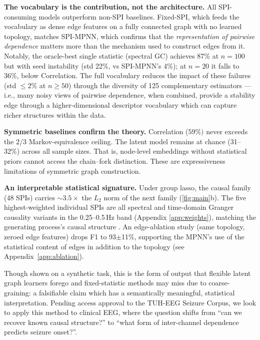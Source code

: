 \documentclass{article}
\begin{document}
\textbf{The vocabulary is the contribution, not the architecture.} All SPI-consuming models outperform non-SPI baselines. Fixed-SPI, which feeds the vocabulary as dense edge features on a fully connected graph with no learned topology, matches SPI-MPNN, which confirms that the \textit{\emph{representation of pairwise dependence}} matters more than the mechanism used to construct edges from it. Notably, the oracle-best single statistic (spectral GC) achieves 87\% at $n{=}100$ but with seed instability (std 22\%, vs SPI-MPNN's 4\%); at $n{=}20$ it falls to 36\%, below Correlation. The full vocabulary reduces the impact of these failures (std ${\leq}2\%$ at $n {\geq} 50$) through the diversity of 125 complementary estimators --- i.e., many noisy views of pairwise dependence, when combined, provide a stability edge through a higher-dimensional descriptor vocabulary which can capture richer structures within the data. 

\textbf{Symmetric baselines confirm the theory.} Correlation ($59\%)$ never exceeds the $2/3$ Markov-equivalence ceiling. The latent model \citep[cf.][]{wu2019} remains at chance (31--32\%) across all sample sizes. That is, node-level embeddings without statistical priors cannot access the chain--fork distinction. These are expressiveness limitations of symmetric graph construction.

\textbf{An interpretable statistical signature.} Under group lasso, the causal family (48 SPIs) carries ${\sim}3.5{\times}$ the $L_2$ norm of the next family (\cref{fig:main}b). The five highest-weighted individual SPIs are all spectral and time-domain Granger causality variants in the 0.25--0.5\,Hz band (Appendix \ref{app:weights}), matching the generating process's causal structure \citep{geweke1982}. An edge-ablation study (same topology, zeroed edge features) drops F1 to 93$\pm$11\%, supporting the MPNN's use of the statistical content of edges in addition to the topology (see Appendix~\ref{app:ablation}).


Though shown on a synthetic task, this is the form of output that flexible latent graph learners forego and fixed-statistic methods may miss due to coarse-graining: a falsifiable claim which has a semantically meaningful, statistical interpretation. Pending access approval to the TUH-EEG Seizure Corpus, we look to apply this method to clinical EEG, where the question shifts from ``can we recover known causal structure?'' to ``what form of inter-channel dependence predicts seizure onset?''.
\end{document}
